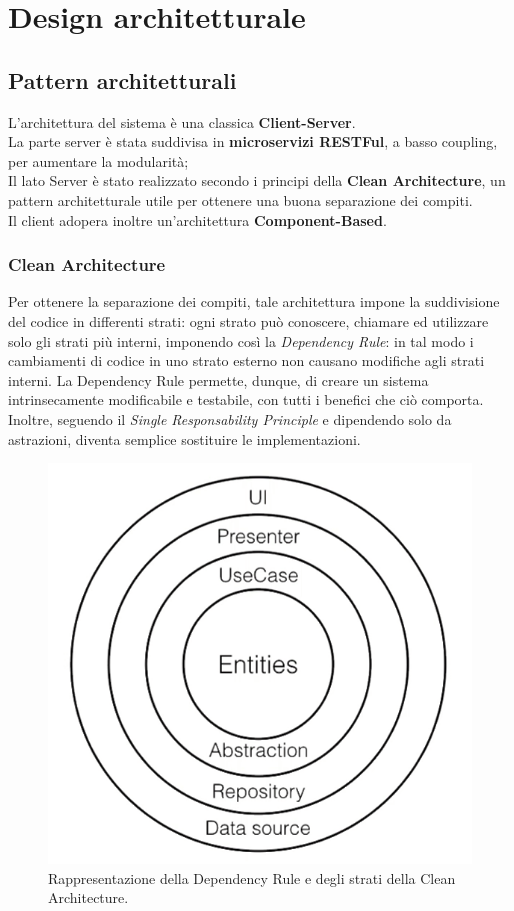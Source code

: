 \chapter{Design architetturale}

\section{Pattern architetturali}
L’architettura del sistema è una classica \textbf{Client-Server}. \\
La parte server è stata suddivisa in \textbf{microservizi RESTFul}, a basso coupling, per aumentare la modularità;
\\
Il lato Server è stato realizzato secondo i principi della \textbf{Clean Architecture}, un pattern architetturale utile per ottenere una buona separazione dei compiti. 
\\
Il client adopera inoltre un'architettura \textbf{Component-Based}.
\subsection{Clean Architecture}
Per ottenere la separazione dei compiti, tale architettura impone la suddivisione del codice in differenti strati: ogni strato
può conoscere, chiamare ed utilizzare solo gli strati più interni, imponendo così la \textit{Dependency Rule}: in tal modo i cambiamenti di codice in uno strato esterno non causano modifiche agli strati interni. La Dependency Rule permette, dunque, di creare un sistema 
intrinsecamente modificabile e testabile, con tutti i benefici che ciò comporta. Inoltre, seguendo il \textit{Single Responsability Principle} e
dipendendo solo da astrazioni, diventa semplice sostituire le implementazioni.
\\

\begin{figure}
  \includegraphics[scale=0.5, center]{images/CleanArchitectureLayersWhite.png}
  \caption{Rappresentazione della Dependency Rule e degli strati della Clean Architecture.}
  \label{fig: clean-architecture-layers-white}
\end{figure}

